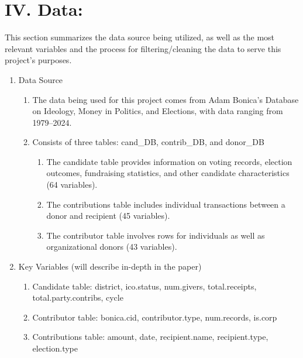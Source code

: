 \documentclass[12pt]{article}
\begin{document}
\section*{IV. Data:} This section summarizes the data source being utilized, as well as the most relevant variables and the process for filtering/cleaning the data to serve this project's purposes.

  \begin{enumerate}[label=\Alph*.]
    \item Data Source
    \begin{enumerate}[label=\arabic*)]
        \item The data being used for this project comes from Adam Bonica's Database on Ideology, Money in Politics, and Elections, with data ranging from 1979--2024.
        \item Consists of three tables: cand\_DB, contrib\_DB, and donor\_DB
        \begin{enumerate}[label=\alph*)]
            \item The candidate table provides information on voting records, election outcomes, fundraising statistics, and other candidate characteristics (64 variables).
            \item The contributions table includes individual transactions between a donor and recipient (45 variables).
            \item The contributor table involves rows for individuals as well as organizational donors (43 variables).
        \end{enumerate}
    \end{enumerate}

    \item Key Variables (will describe in-depth in the paper)
    \begin{enumerate}[label=\arabic*)]
        \item Candidate table: district, ico.status, num.givers, total.receipts, total.party.contribs, cycle
        \item Contributor table: bonica.cid, contributor.type, num.records, is.corp
        \item Contributions table: amount, date, recipient.name, recipient.type, election.type
    \end{enumerate}
    

\end{enumerate}
\end{document}
